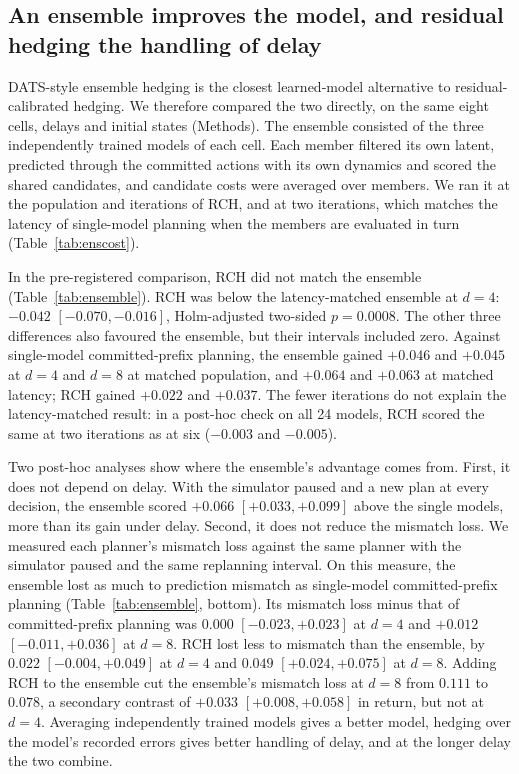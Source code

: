 \documentclass[pdflatex,sn-nature]{sn-jnl}%
\begin{document}
\subsection{An ensemble improves the model, and residual hedging the handling of delay}\label{sec:ensemble}

DATS-style ensemble hedging\cite{chen2020dats} is the closest learned-model alternative to residual-calibrated hedging. We therefore compared the two directly, on the same eight cells, delays and initial states (Methods). The ensemble consisted of the three independently trained models of each cell. Each member filtered its own latent, predicted through the committed actions with its own dynamics and scored the shared candidates, and candidate costs were averaged over members. We ran it at the population and iterations of RCH, and at two iterations, which matches the latency of single-model planning when the members are evaluated in turn (Table~\ref{tab:enscost}).

In the pre-registered comparison, RCH did not match the ensemble (Table~\ref{tab:ensemble}). RCH was below the latency-matched ensemble at $d=4$: $-0.042$ $[-0.070, -0.016]$, Holm-adjusted two-sided $p=0.0008$. The other three differences also favoured the ensemble, but their intervals included zero. Against single-model committed-prefix planning, the ensemble gained $+0.046$ and $+0.045$ at $d=4$ and $d=8$ at matched population, and $+0.064$ and $+0.063$ at matched latency; RCH gained $+0.022$ and $+0.037$. The fewer iterations do not explain the latency-matched result: in a post-hoc check on all 24 models, RCH scored the same at two iterations as at six ($-0.003$ and $-0.005$).

Two post-hoc analyses show where the ensemble's advantage comes from. First, it does not depend on delay. With the simulator paused and a new plan at every decision, the ensemble scored $+0.066$ $[+0.033, +0.099]$ above the single models, more than its gain under delay. Second, it does not reduce the mismatch loss. We measured each planner's mismatch loss against the same planner with the simulator paused and the same replanning interval. On this measure, the ensemble lost as much to prediction mismatch as single-model committed-prefix planning (Table~\ref{tab:ensemble}, bottom). Its mismatch loss minus that of committed-prefix planning was $0.000$ $[-0.023, +0.023]$ at $d=4$ and $+0.012$ $[-0.011, +0.036]$ at $d=8$. RCH lost less to mismatch than the ensemble, by $0.022$ $[-0.004, +0.049]$ at $d=4$ and $0.049$ $[+0.024, +0.075]$ at $d=8$. Adding RCH to the ensemble cut the ensemble's mismatch loss at $d=8$ from $0.111$ to $0.078$, a secondary contrast of $+0.033$ $[+0.008, +0.058]$ in return, but not at $d=4$. Averaging independently trained models gives a better model, hedging over the model's recorded errors gives better handling of delay, and at the longer delay the two combine.
\end{document}
